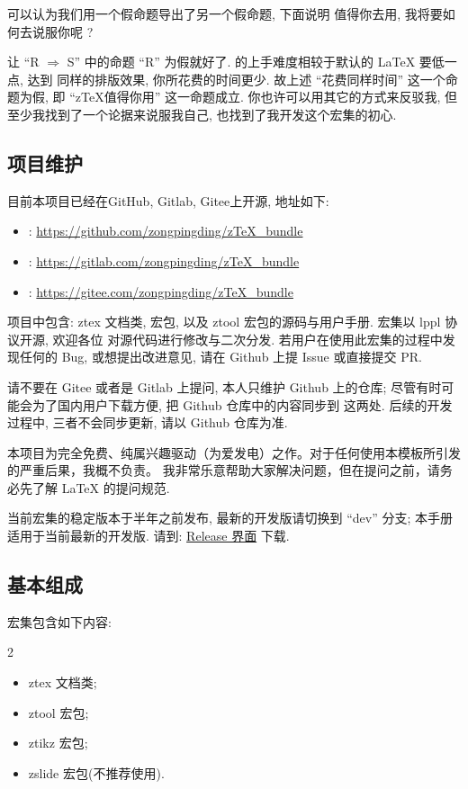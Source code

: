 \documentclass[
  hyper, lang=cn,
  classOption = {11pt},
  mathSpec={envStyle=leftbar},
]{../../zlatex/code/ztex}
\newcommand{\pkg}[1]{\textsf{#1}}
\newcommand{\cls}[1]{\textsf{#1}}
\def\lrr#1{\ensuremath{\Rightarrow}}
\begin{document}
可以认为我们用一个假命题导出了另一个假命题, 下面说明 \zTeX{} 值得你去用, 我将要如何去说服你呢 ? 


让 ``R\; \lrr{} S'' 中的命题 ``R'' 为假就好了. \ztex{} 的上手难度相较于默认的 \LaTeX{} 要低一点, 达到
同样的排版效果, 你所花费的时间更少. 故上述 ``花费同样时间'' 这一个命题为假, 即 ``z\TeX{}值得你用'' 这一命题成立.
你也许可以用其它的方式来反驳我, 但至少我找到了一个论据来说服我自己, 也找到了我开发这个宏集的初心.

\subsection{项目维护}
目前本项目已经在GitHub, Gitlab, Gitee上开源, 地址如下:

\hspace*{6em}\parbox{\textwidth}{
\begin{itemize}
  \item [GitHub]: \href{https://github.com/zongpingding/zTeX_bundle}{https://github.com/zongpingding/zTeX\_bundle}
  \item [Gitlab]: \href{https://gitlab.com/zongpingding/zTeX_bundle}{https://gitlab.com/zongpingding/zTeX\_bundle}
  \item [Gitee] : \href{https://gitee.com/zongpingding/zTeX_bundle}{https://gitee.com/zongpingding/zTeX\_bundle}
\end{itemize}}

项目中包含: \cls{ztex} 文档类, \zTikZ{} 宏包, 以及 \pkg{ztool} 宏包的源码与用户手册. \ztex{} 宏集以 lppl 协议开源, 欢迎各位
对源代码进行修改与二次分发. 若用户在使用此宏集的过程中发现任何的 Bug, 或想提出改进意见, 请在 Github 上提 Issue 或直接提交 PR. 


请不要在 Gitee 或者是 Gitlab 上提问, 本人只维护 Github 上的仓库; 尽管有时可能会为了国内用户下载方便, 把 Github 仓库中的内容同步到
这两处. 后续的开发过程中, 三者不会同步更新, 请以 Github 仓库为准.

本项目为完全免费、纯属兴趣驱动（为爱发电）之作。对于任何使用本模板所引发的严重后果，我概不负责。
我非常乐意帮助大家解决问题，但在提问之前，请务必先了解 \LaTeX{} 的提问规范.

当前宏集的稳定版本于半年之前发布, 最新的开发版请切换到 ``dev'' 分支; 本手册适用于当前最新的开发版.
请到: \href{https://github.com/zongpingding/zTeX_bundle/releases}{Release 界面} 下载.


\clearpage
\subsection{基本组成}
\ztex{} 宏集包含如下内容:
\begin{multicols}{2}
  \begin{itemize}
  \item \cls{ztex} 文档类;
  \item \pkg{ztool} 宏包;
  \item \pkg{ztikz} 宏包;
  \item \pkg{zslide} 宏包(不推荐使用).
\end{itemize}
\end{multicols}
\end{document}
